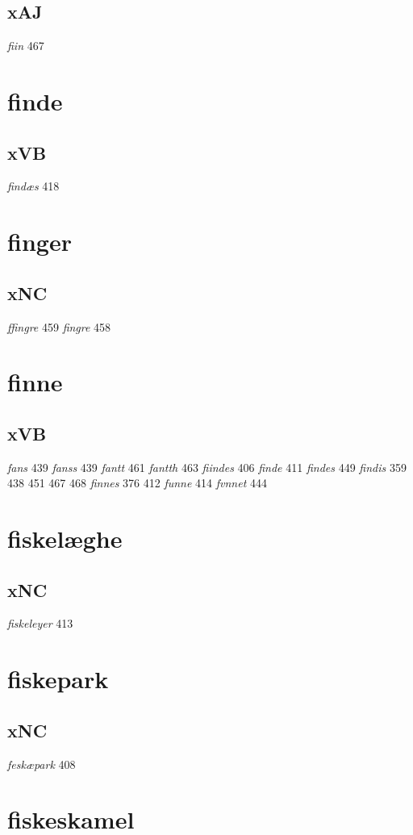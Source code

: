 \documentclass[a4paper,twocolumn]{article}
\begin{document}
\subsection{xAJ}
\label{sec:org3f0ab11}
\emph{fiin} 467 
\section{finde}
\label{sec:orgaabeb83}
\subsection{xVB}
\label{sec:org51612ab}
\emph{findæs} 418 
\section{finger}
\label{sec:org20e2b10}
\subsection{xNC}
\label{sec:orgf4cda80}
\emph{ffingre} 459 \emph{fingre} 458 
\section{finne}
\label{sec:org9f92880}
\subsection{xVB}
\label{sec:org2b91a42}
\emph{fans} 439 \emph{fanss} 439 \emph{fantt} 461 \emph{fantth} 463 \emph{fiindes} 406 \emph{finde} 411 \emph{findes} 449 \emph{findis} 359 438 451 467 468 \emph{finnes} 376 412 \emph{funne} 414 \emph{fvnnet} 444 
\section{fiskelæghe}
\label{sec:org72e1a75}
\subsection{xNC}
\label{sec:org3158cba}
\emph{fiskeleyer} 413 
\section{fiskepark}
\label{sec:orgc09a064}
\subsection{xNC}
\label{sec:orga028e8b}
\emph{feskæpark} 408 
\section{fiskeskamel}
\label{sec:org6f513f1}
\end{document}
